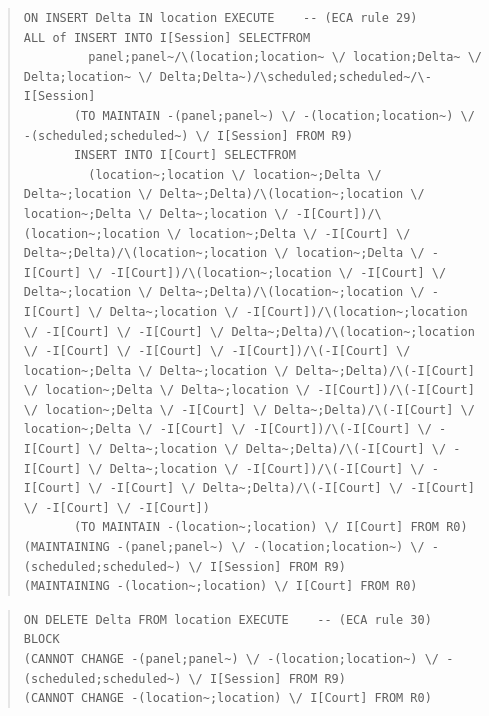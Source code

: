 \documentclass[10pt,a4paper]{report}              %
\theoremstyle{plain}\theorembodyfont{\rmfamily}\newtheorem{definition}{Definition}[section]
\theoremstyle{plain}\theorembodyfont{\rmfamily}\newtheorem{designrule}[definition]{Requirement}
\begin{document}
\begin{quote}
\begin{verbatim}
ON INSERT Delta IN location EXECUTE    -- (ECA rule 29)
ALL of INSERT INTO I[Session] SELECTFROM
         panel;panel~/\(location;location~ \/ location;Delta~ \/ Delta;location~ \/ Delta;Delta~)/\scheduled;scheduled~/\-I[Session]
       (TO MAINTAIN -(panel;panel~) \/ -(location;location~) \/ -(scheduled;scheduled~) \/ I[Session] FROM R9)
       INSERT INTO I[Court] SELECTFROM
         (location~;location \/ location~;Delta \/ Delta~;location \/ Delta~;Delta)/\(location~;location \/ location~;Delta \/ Delta~;location \/ -I[Court])/\(location~;location \/ location~;Delta \/ -I[Court] \/ Delta~;Delta)/\(location~;location \/ location~;Delta \/ -I[Court] \/ -I[Court])/\(location~;location \/ -I[Court] \/ Delta~;location \/ Delta~;Delta)/\(location~;location \/ -I[Court] \/ Delta~;location \/ -I[Court])/\(location~;location \/ -I[Court] \/ -I[Court] \/ Delta~;Delta)/\(location~;location \/ -I[Court] \/ -I[Court] \/ -I[Court])/\(-I[Court] \/ location~;Delta \/ Delta~;location \/ Delta~;Delta)/\(-I[Court] \/ location~;Delta \/ Delta~;location \/ -I[Court])/\(-I[Court] \/ location~;Delta \/ -I[Court] \/ Delta~;Delta)/\(-I[Court] \/ location~;Delta \/ -I[Court] \/ -I[Court])/\(-I[Court] \/ -I[Court] \/ Delta~;location \/ Delta~;Delta)/\(-I[Court] \/ -I[Court] \/ Delta~;location \/ -I[Court])/\(-I[Court] \/ -I[Court] \/ -I[Court] \/ Delta~;Delta)/\(-I[Court] \/ -I[Court] \/ -I[Court] \/ -I[Court])
       (TO MAINTAIN -(location~;location) \/ I[Court] FROM R0)
(MAINTAINING -(panel;panel~) \/ -(location;location~) \/ -(scheduled;scheduled~) \/ I[Session] FROM R9)
(MAINTAINING -(location~;location) \/ I[Court] FROM R0)
\end{verbatim}
\end{quote}
\begin{quote}
\begin{verbatim}
ON DELETE Delta FROM location EXECUTE    -- (ECA rule 30)
BLOCK
(CANNOT CHANGE -(panel;panel~) \/ -(location;location~) \/ -(scheduled;scheduled~) \/ I[Session] FROM R9)
(CANNOT CHANGE -(location~;location) \/ I[Court] FROM R0)
\end{verbatim}
\end{quote}
\end{document}
